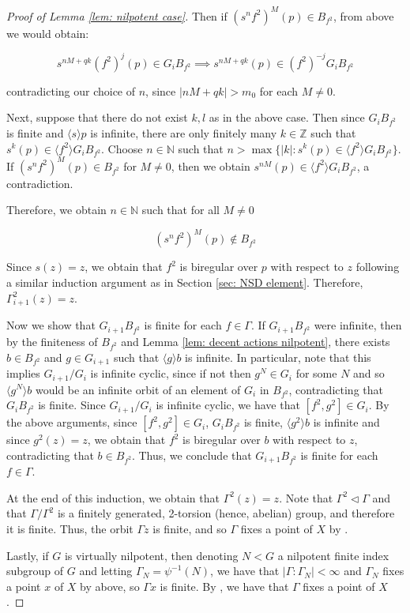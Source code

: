 \documentclass[12pt]{article}
\theoremstyle{definition}
\newcommand{\N}{\mathbb{N}}
\newcommand{\Z}{\mathbb{Z}}
\begin{document}
\begin{proof}[Proof of Lemma \ref{lem: nilpotent case}]
    Then if $(s^n f^2)^M (p) \in B_{f^2}$, from above we would obtain: 

    $$s^{nM+qk} (f^2)^j (p) \in G_i B_{f^2} \implies s^{nM+qk}(p) \in (f^2)^{-j} G_i B_{f^2}$$

    contradicting our choice of $n$, since $\vert nM + qk \vert > m_0$ for each $M \neq 0$.

    Next, suppose that there do not exist $k,l$ as in the above case. Then since $G_iB_{f^2}$ is finite and $\langle s \rangle p$ is infinite, there are only finitely many $k \in \Z$ such that $s^k (p) \in \langle f^2 \rangle G_i B_{f^2}$. Choose $n \in \N$ such that $n > \max\{\vert k \vert : s^k (p) \in \langle f^2 \rangle G_i B_{f^2}\}$. If $(s^nf^2)^M (p) \in B_{f^2}$ for $M \neq 0$, then we obtain $s^{nM}(p) \in \langle f^2 \rangle G_i B_{f^2}$, a contradiction. 

    Therefore, we obtain $n \in \N$ such that for all $M \neq 0$
    
    $$(s^n f^2)^M (p) \notin B_{f^2}$$

    Since $s(z) = z$, we obtain that $f^2$ is biregular over $p$ with respect to $z$ following a similar induction argument as in Section \ref{sec: NSD element}. Therefore, $\Gamma_{i+1}^2(z) = z$. 

    Now we show that $G_{i+1} B_{f^2}$ is finite for each $f \in \Gamma$. If $G_{i+1} B_{f^2}$ were infinite, then by the finiteness of $B_{f^2}$ and Lemma \ref{lem: decent actions nilpotent}, there exists $b \in B_{f^2}$ and $g\in G_{i+1}$ such that $\langle g \rangle b$ is infinite. In particular, note that this implies $G_{i+1}/G_i$ is infinite cyclic, since if not then $g^N \in G_i$ for some $N$ and so $\langle g^N \rangle b$ would be an infinite orbit of an element of $G_i$ in $B_{f^2}$, contradicting that $G_i B_{f^2}$ is finite. Since $G_{i+1}/G_i$ is infinite cyclic, we have that $[f^2, g^2] \in G_i$. By the above arguments, since $[f^2, g^2] \in G_i$, $G_i B_{f^2}$ is finite, $\langle g^2 \rangle b$ is infinite and since $g^2(z) = z$, we obtain that $f^2$ is biregular over $b$ with respect to $z$, contradicting that $b \in B_{f^2}$. Thus, we conclude that $G_{i+1} B_{f^2}$ is finite for each $f \in \Gamma$. 

    At the end of this induction, we obtain that $\Gamma^2 (z) = z$. Note that $\Gamma^2 \triangleleft \Gamma$ and that $\Gamma / \Gamma^2$ is a finitely generated, 2-torsion (hence, abelian) group, and therefore it is finite. Thus, the orbit $\Gamma z$ is finite, and so $\Gamma$ fixes a point of $X$ by \cite[Remark 4.2]{Algebraic}. 

    Lastly, if $G$ is virtually nilpotent, then denoting $N < G$ a nilpotent finite index subgroup of $G$ and letting $\Gamma_N = \psi^{-1}(N)$, we have that $\vert \Gamma :  \Gamma_N \vert < \infty$ and $\Gamma_N$ fixes a point $x$ of $X$ by above, so $\Gamma x$ is finite. By \cite[Remark 4.2]{Algebraic}, we have that $\Gamma$ fixes a point of $X$. 
    
\end{proof}
\end{document}
